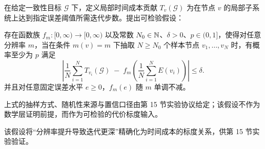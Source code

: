 在给定一致性目标 $\mathcal G$ 下，定义局部时间成本贡献 $T_v(\mathcal G)$ 为在节点 $v$ 的局部子系统上达到指定误差阈值所需迭代步数。提出可检验假设：

\begin{assumption}\label{ass:resolution_time_scaling}
\InterfaceTag 存在函数族 $f_m:[0,\infty)\to[0,\infty)$ 以及常数 $N_0\in\mathbb{N}$、$\delta>0$、$p\in(0,1]$，使得对任意分辨率 $m$，当在条件 $m(v)=m$ 下抽取 $N\ge N_0$ 个样本节点 $v_1,\dots,v_N$ 时，有概率至少为 $p$ 满足
$$
\left\lvert
\frac{1}{N}\sum_{i=1}^N T_{v_i}(\mathcal G)\;-\;
f_m\!\left(\frac{1}{N}\sum_{i=1}^N E(v_i)\right)
\right\rvert\le \delta.
$$
并且对任意固定误差水平 $e\ge 0$，$f_m(e)$ 随 $m$ 单调不减。

\AuditTag 上式的抽样方式、随机性来源与置信口径由第 15 节实验协议给定；该假设不作为数学层证明前提，而作为可检验的代价标度输入。
\end{assumption}

该假设将“分辨率提升导致迭代更深”精确化为时间成本的标度关系，供第 15 节实验验证。
